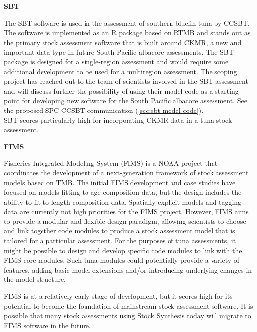 \documentclass{SCreport}
\begin{document}
\vspace{1ex}

\textbf{SBT}
\label{sbt-software-evaluation}

\vspace{-1ex}

The SBT software is used in the assessment of southern bluefin tuna by CCSBT.
The software is implemented as an R package based on RTMB and stands out as the
primary stock assessment software that is built around CKMR, a new and important
data type in future South Pacific albacore assessments. The SBT package is
designed for a single-region assessment and would require some additional
development to be used for a multiregion assessment. The scoping project has
reached out to the team of scientists involved in the SBT assessment and will
discuss further the possibility of using their model code as a starting point
for developing new software for the South Pacific albacore assessment. See the
proposed SPC-CCSBT communication (\autoref{sec:sbt-model-code}).\\[-4.5ex]

SBT scores particularly high for incorporating CKMR data in a tuna stock
assessment.

\vspace{1ex}

\textbf{FIMS}
\label{sec:fims-software-evaluation}

\vspace{-1ex}

Fisheries Integrated Modeling System (FIMS) is a NOAA project that coordinates
the development of a next-generation framework of stock assessment models based
on TMB. The initial FIMS development and case studies have focused on models
fitting to age composition data, but the design includes the ability to fit to
length composition data. Spatially explicit models and tagging data are
currently not high priorities for the FIMS project. However, FIMS aims to
provide a modular and flexible design paradigm, allowing scientists to choose
and link together code modules to produce a stock assessment model that is
tailored for a particular assessment. For the purposes of tuna assessments, it
might be possible to design and develop specific code modules to link with the
FIMS core modules. Such tuna modules could potentially provide a variety of
features, adding basic model extensions and/or introducing underlying changes in
the model structure.

FIMS is at a relatively early stage of development, but it scores high for its
potential to become the foundation of mainstream stock assessment software. It
is possible that many stock assessments using Stock Synthesis today will migrate
to FIMS software in the future.
\end{document}
